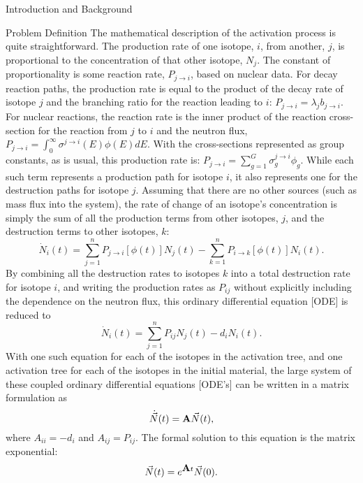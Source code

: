 \begin{chapter}{Introduction and Background}
\begin{section}{Problem Definition\label{sec:intro.prob_def}}
    The mathematical description of the activation process is quite
    straightforward.  The production rate of one isotope, $i$, from
    another, $j$, is proportional to the concentration of that other
    isotope, $N_j$.  The constant of proportionality is some reaction
    rate, $P_{j\rightarrow i}$, based on nuclear data.  For decay
    reaction paths, the production rate is equal to the product of the
    decay rate of isotope $j$ and the branching ratio for the reaction
    leading to $i$: $P_{j\rightarrow i} = \lambda_j b_{j\rightarrow
      i}.$ For nuclear reactions, the reaction rate is the inner
    product of the reaction cross-section for the reaction from $j$ to
    $i$ and the neutron flux, $P_{j\rightarrow i} = \int_0^\infty
    \sigma^{j\rightarrow i}(E)\phi(E) dE$.  With the cross-sections
    represented as group constants, as is usual, this production rate
    is: $P_{j\rightarrow i} = \sum_{g=1}^G \sigma_g^{j\rightarrow i}
    \phi_g.$ While each such term represents a production path for
    isotope $i$, it also represents one for the destruction paths for
    isotope $j$.  Assuming that there are no other sources (such as
    mass flux into the system), the rate of change of an isotope's
    concentration is simply the sum of all the production terms from
    other isotopes, $j$, and the destruction terms to other isotopes,
    $k$:
    \begin{equation*}
      \dot{N}_i(t) = \sum_{j=1}^n P_{j\rightarrow
        i}\left[\phi(t)\right]N_j(t) - \sum_{k=1}^n P_{i \rightarrow
        k}\left[\phi(t)\right]N_i(t).
    \end{equation*}
    By combining all the destruction rates to isotopes $k$ into a
    total destruction rate for isotope $i$, and writing the production
    rates as $P_{ij}$ without explicitly including the dependence on
    the neutron flux, this ordinary differential equation [ODE] is
    reduced to
    \begin{equation*}
      \dot{N}_i(t) = \sum_{j=1}^n P_{ij}N_j(t) - d_i N_i(t).
    \end{equation*}
    With one such equation for each of the isotopes in the activation
    tree, and one activation tree for each of the isotopes in the
    initial material, the large system of these coupled ordinary
    differential equations [ODE's] can be written in a matrix
    formulation as
    \begin{equation}
      \dot{\vec{N}}(t) = \mbox{$\mathbf{A}$}\vec{N}(t),\label{eqn:intro.basic_ode}
    \end{equation}
    where $A_{ii} = -d_i$ and $A_{ij} = P_{ij}$.  The formal solution
    to this equation is the matrix exponential:
    \begin{equation}
      \vec{N}(t) = e^{\mbox{$\mathbf{A}$}t}\vec{N}(0).\label{eqn:intro.basic_soln}
    \end{equation}
    

\end{section}
\end{chapter}
